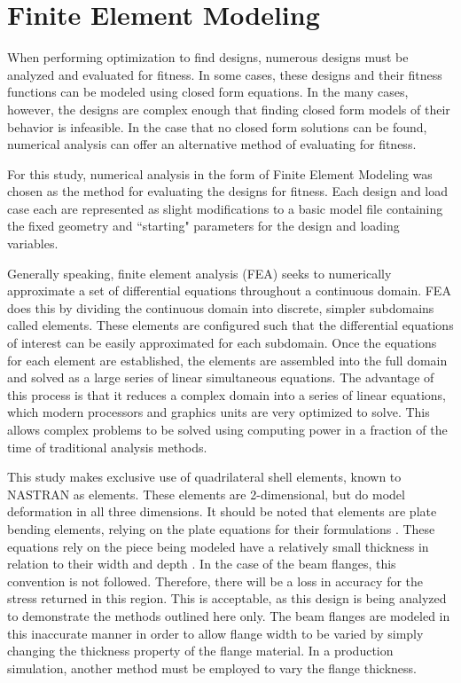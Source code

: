 \section{Finite Element Modeling}

When performing optimization to find designs, numerous designs must be analyzed and evaluated for fitness. In some cases, these designs and their fitness functions can be modeled using closed form equations. In the many cases, however, the designs are complex enough that finding closed form models of their behavior is infeasible. In the case that no closed form solutions can be found, numerical analysis can offer an alternative method of evaluating for fitness. 

For this study, numerical analysis in the form of Finite Element Modeling was chosen as the method for evaluating the designs for fitness. Each design and load case each are represented as slight modifications to a basic model file containing the fixed geometry and ``starting" parameters for the design and loading variables. 

Generally speaking, finite element analysis (FEA) seeks to numerically approximate a set of differential equations throughout a continuous domain. FEA does this by dividing the continuous domain into discrete, simpler subdomains called elements. These elements are configured such that the differential equations of interest can be easily approximated for each subdomain. Once the equations for each element are established, the elements are assembled into the full domain and solved as a large series of linear simultaneous equations. The advantage of this process is that it reduces a complex domain into a series of linear equations, which modern processors and graphics units are very optimized to solve. This allows complex problems to be solved using computing power in a fraction of the time of traditional analysis methods. \cite{reddy}

This study makes exclusive use of quadrilateral shell elements, known to NASTRAN as  elements. These elements are 2-dimensional, but do model deformation in all three dimensions. It should be noted that  elements are plate bending elements, relying on the plate equations for their formulations \cite{nastran-qrg}. These equations rely on the piece being modeled have a relatively small thickness in relation to their width and depth \cite{reddy}. In the case of the beam flanges, this convention is not followed. Therefore, there will be a loss in accuracy for the stress returned in this region. This is acceptable, as this design is being analyzed to demonstrate the methods outlined here only. The beam flanges are modeled in this inaccurate manner in order to allow flange width to be varied by simply changing the thickness property of the flange material. In a production simulation, another method must be employed to vary the flange thickness.  


